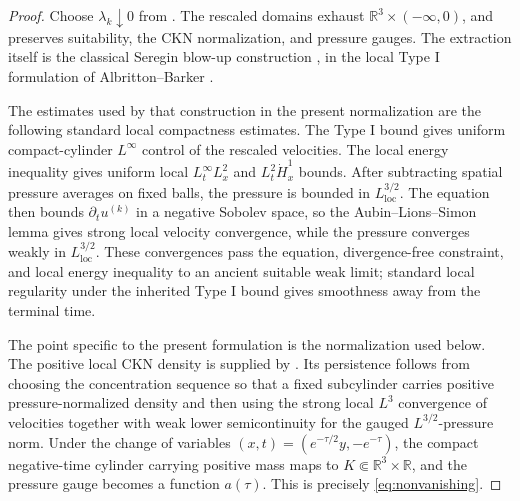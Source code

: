 \documentclass[11pt]{amsart}
\theoremstyle{plain}
\theoremstyle{definition}
\theoremstyle{remark}
\numberwithin{equation}{section}
\begin{document}
\begin{proof}
Choose \(\lambda_k\downarrow0\) from .  The
rescaled domains exhaust \(\mathbb R^3\times(-\infty,0)\), and
 preserves suitability, the CKN normalization, and
pressure gauges.  The extraction itself is the classical Seregin
blow-up construction \cite{Seregin2012}, in the local Type I formulation of
Albritton--Barker \cite{AlbrittonBarker2019}.

The estimates used by that construction in the present normalization are the
following standard local compactness estimates.  The Type I bound gives
uniform compact-cylinder \(L^\infty\) control of the rescaled velocities.
The local energy inequality gives uniform local \(L^\infty_tL^2_x\) and
\(L^2_t\dot H^1_x\) bounds.  After subtracting spatial pressure averages on
fixed balls, the pressure is bounded in \(L^{3/2}_{\mathrm{loc}}\).  The
equation then bounds \(\partial_t u^{(k)}\) in a negative Sobolev space, so
the Aubin--Lions--Simon lemma gives strong local velocity convergence, while
the pressure converges weakly in \(L^{3/2}_{\mathrm{loc}}\).  These
convergences pass the equation, divergence-free constraint, and local energy
inequality to an ancient suitable weak limit; standard local regularity under
the inherited Type I bound gives smoothness away from the terminal time.

The point specific to the present formulation is the normalization used below.
The positive local CKN density is supplied by .
Its persistence follows from choosing the concentration sequence so that a
fixed subcylinder carries positive pressure-normalized density and then using
the strong local \(L^3\) convergence of velocities together with weak lower
semicontinuity for the gauged \(L^{3/2}\)-pressure norm.  Under the change of
variables \((x,t)=(e^{-\tau/2}y,-e^{-\tau})\), the compact negative-time
cylinder carrying positive mass maps to
\(K\Subset\mathbb R^3\times\mathbb R\), and the pressure gauge becomes a
function \(a(\tau)\).  This is precisely \eqref{eq:nonvanishing}.
\end{proof}
\end{document}
